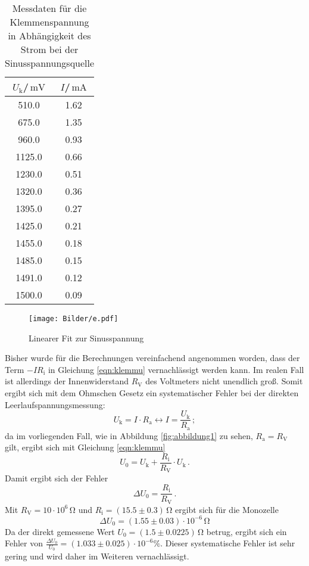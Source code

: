 \begin{table}
  \centering
  \caption{Messdaten für die Klemmenspannung in Abhängigkeit des Strom bei der Sinusspannungsquelle}
  \label{tab:sinus}

\begin{tabular}{cc}
  \toprule
$U_\text{k}$/$\,\si{\milli\volt}$ & $I$/$\,\si{\milli\ampere}$\\
\midrule
510.0 & 1.62 \\
675.0 & 1.35 \\
960.0 & 0.93 \\
1125.0 & 0.66 \\
1230.0 & 0.51 \\
1320.0 & 0.36 \\
1395.0 & 0.27 \\
1425.0 & 0.21 \\
1455.0 & 0.18 \\
1485.0 & 0.15 \\
1491.0 & 0.12 \\
1500.0 & 0.09 \\
\bottomrule
\end{tabular}
\end{table}
\begin{figure}
\texttt{[image: Bilder/e.pdf]}
\caption{Linearer Fit zur Sinusspannung}
\label{fig:plot_sinus}
\end{figure}
Bisher wurde für die Berechnungen vereinfachend angenommen worden,
dass der Term $-IR_\text{i}$ in Gleichung \eqref{eqn:klemmu} vernachlässigt werden kann. Im realen Fall ist allerdings der Innenwiderstand $R_\text{V}$ des Voltmeters nicht unendlich groß.
Somit ergibt sich mit dem Ohmschen Gesetz ein systematischer Fehler bei der direkten Leerlaufspannungsmessung:
\begin{equation*}
  U_\text{k}=I\cdot R_\text{a} \leftrightarrow I=\frac{U_\text{k}}{R_\text{a}}\, ;
\end{equation*}
da im vorliegenden Fall, wie in Abbildung \ref{fig:abbildung1} zu sehen, $R_\text{a}=R_\text{V}$ gilt, ergibt sich mit Gleichung \eqref{eqn:klemmu}
\begin{equation*}
U_\text{0}=U_\text{k}+\frac{R_\text{i}}{R_\text{V}}\cdot U_\text{k}\, .
\end{equation*}
Damit ergibt sich der Fehler
\begin{equation*}
  \Delta  U_\text{0}=\frac{R_\text{i}}{R_\text{V}} \, .
\end{equation*}
Mit $R_\text{V}=10 \cdot 10^6 \,\si{\ohm}$ und $R_\text{i}=(15.5\pm0.3)\,\si{\ohm}$ ergibt sich für die Monozelle
\begin{equation*}
\Delta U_\text{0}= (1.55 \pm 0.03)\cdot 10^{-6}\, \si{\ohm}
\end{equation*}
Da der direkt gemessene Wert $U_\text{0}=(1.5 \pm 0.0225)\, \si{\ohm}$ betrug, ergibt sich ein Fehler von $\frac{\Delta U_\text{0}}{U_\text{0}}=(1.033\pm0.025)\cdot 10^{-6} \%$.
Dieser systematische Fehler ist sehr gering und wird daher im Weiteren vernachlässigt.

